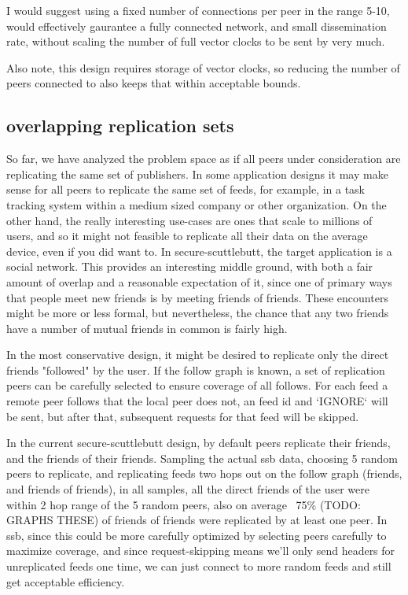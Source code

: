\documentclass[sigconf]{acmart}
\begin{document}
I would suggest using a fixed number of connections per peer in the
range 5-10, would effectively gaurantee a fully connected network, and
small dissemination rate, without scaling the number of full vector
clocks to be sent by very much.

Also note, this design requires storage of vector clocks, so reducing
the number of peers connected to also keeps that within acceptable
bounds.

\subsection{overlapping replication sets}

So far, we have analyzed the problem space as if all peers under
consideration are replicating the same set of publishers. In some
application designs it may make sense for all peers to replicate the
same set of feeds, for example, in a task tracking system within a
medium sized company or other organization.  On the other hand, the
really interesting use-cases are ones that scale to millions of users,
and so it might not feasible to replicate all their data on the
average device, even if you did want to. In secure-scuttlebutt, the
target application is a social network.  This provides an interesting
middle ground, with both a fair amount of overlap and a reasonable
expectation of it, since one of primary ways that people meet new
friends is by meeting friends of friends. These encounters might be
more or less formal, but nevertheless, the chance that any two friends
have a number of mutual friends in common is fairly high.

In the most conservative design, it might be desired to replicate only
the direct friends "followed" by the user. If the follow graph is
known, a set of replication peers can be carefully selected to ensure
coverage of all follows. For each feed a remote peer follows that the
local peer does not, an feed id and `IGNORE` will be sent, but after
that, subsequent requests for that feed will be skipped.

In the current secure-scuttlebutt design, by default peers replicate
their friends, and the friends of their friends. Sampling the actual
ssb data, choosing 5 random peers to replicate, and replicating feeds
two hops out on the follow graph (friends, and friends of friends), in
all samples, all the direct friends of the user were within 2 hop
range of the 5 random peers, also on average ~75\% (TODO: GRAPHS THESE)
of friends of friends were replicated by at least one peer. In ssb,
since this could be more carefully optimized by selecting peers
carefully to maximize coverage, and since request-skipping means we'll
only send headers for unreplicated feeds one time, we can just connect
to more random feeds and still get acceptable efficiency.
\end{document}
